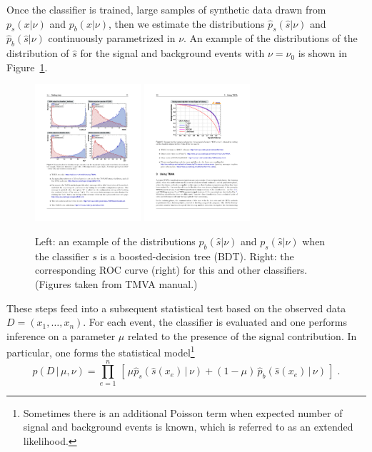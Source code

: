 \documentclass[11pt, oneside]{article}   	%
\begin{document}
 Once the classifier is trained, large samples of synthetic data drawn from $p_s(x | \nu)$ and $p_b(x | \nu)$, then we estimate the distributions  $\hat{p}_s(\hat s | \nu)$ and $\hat{p}_b(\hat s | \nu)$ continuously parametrized in $\nu$. 
An example of the distributions of the distribution of $\hat s$ for the signal and background events with $\nu=\nu_0$ is shown in Figure~\ref{fig:tmva}.


\begin{figure}[htbp]
\begin{center}
 \includegraphics[height=2in]{example-TMVA-BDT.pdf}
 \includegraphics[height=2in]{example-TMVA-ROC.pdf}
\caption{Left: an example of the distributions $p_b(\hat s|\nu)$ and $p_s(\hat s|\nu)$ when the classifier $s$ is a boosted-decision tree (BDT). Right: the corresponding ROC curve (right) for this and other classifiers. (Figures taken from TMVA manual.)}
\label{fig:tmva}
\end{center}
\end{figure}

These steps feed into a subsequent statistical test based on the observed data \\
${D=(x_1, \dots, x_n)}$. For each event, the classifier is evaluated and one performs inference on a parameter $\mu$ related to the presence of the signal contribution. In particular, one forms the statistical model\footnote{Sometimes there is an additional Poisson term when expected number of signal and background events is known, which is referred to as an extended likelihood.} 
\begin{equation}\label{eq:typicalML}
p( D \,|\, \mu, \nu) = \prod_{e=1}^n \, \left[\, \mu \hat{p}_s( \hat s(x_e) \, |\,  \nu)  + (1-\mu)\, \hat{p}_b( \hat s(x_e) \,|\, \nu) \,\right] \; .
\end{equation}
\end{document}
